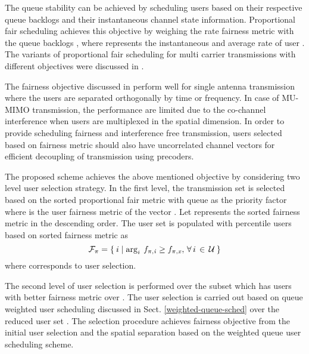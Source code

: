 
The queue stability can be achieved by scheduling users based on their respective queue backlogs and their instantaneous channel state information. Proportional fair scheduling achieves this objective by weighing the rate fairness metric  with the queue backlogs , where  represents the instantaneous and average rate of user . The variants of proportional fair scheduling for multi carrier transmissions with different objectives were discussed in \cite{adaptation_crosslayer}.

The fairness objective discussed in \cite{adaptation_crosslayer} perform well for single antenna transmission where the users are separated orthogonally by time or frequency. In case of MU-MIMO transmission, the performance are limited due to the co-channel interference when users are multiplexed in the spatial dimension. In order to provide scheduling fairness and interference free transmission, users selected based on fairness metric should also have uncorrelated channel vectors for efficient decoupling of transmission using precoders.

The proposed scheme achieves the above mentioned objective by considering two level user selection strategy. In the first level, the transmission set  is selected based on the sorted proportional fair metric with queue as the priority factor  where  is the  user fairness metric of the vector . Let  represents the sorted fairness metric in the descending order. The user set  is populated with  percentile users based on sorted fairness metric  as
\begin{equation}
\mathcal{F}_\pi = \left \lbrace \: i \mid \arg_i \: {f}_{\mathit{\pi},\mathit{i}} \geq {f}_{\mathit{\pi},\mathit{x}}, \, \forall \, i \, \in \, \mathcal{U} \: \right \rbrace
\end{equation}
where  corresponds to  user selection.

The second level of user selection is performed over the subset  which has users with better fairness metric over . The user selection is carried out based on queue weighted user scheduling discussed in Sect. \ref{weighted-queue-sched} over the reduced user set . The selection procedure achieves fairness objective from the initial user selection and the spatial separation based on the weighted queue user scheduling scheme.
